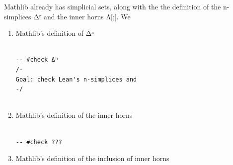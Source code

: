\documentclass{book}
\theoremstyle{definition}
\newcounter{lcounter}
\begin{document}
Mathlib already has simplicial sets, along with the the definition of the n-simplices Δⁿ and the inner horns Λ[;]. We 

\begin{enumerate}
\item Mathlib's definition of Δⁿ

\begin{center}
\begin{tcolorbox}[width=5in,colback={white},title={\begin{center}\texttt{Lean \thelcounter} \addtocounter{lcounter}{1}  \end{center}},colbacktitle=Blue,coltitle=black]
\begin{verbatim}

-- #check Δⁿ
/-
Goal: check Lean's n-simplices and 
-/


\end{verbatim}
\end{tcolorbox}
\end{center}

\item Mathlib's definition of the inner horns

\begin{center}
\begin{tcolorbox}[width=5in,colback={white},title={\begin{center}\texttt{Lean \thelcounter} \addtocounter{lcounter}{1}  \end{center}},colbacktitle=Blue,coltitle=black]
\begin{verbatim}

-- #check ???

\end{verbatim}
\end{tcolorbox}
\end{center}

\item Mathlib's definition of the inclusion of inner horns

\begin{center}
\begin{tcolorbox}[width=5in,colback={white},title={\begin{center}\texttt{Lean \thelcounter} \addtocounter{lcounter}{1}  \end{center}},colbacktitle=Blue,coltitle=black]
\begin{verbatim}


\end{verbatim}
\end{tcolorbox}
\end{center}
\end{enumerate}
\end{document}
